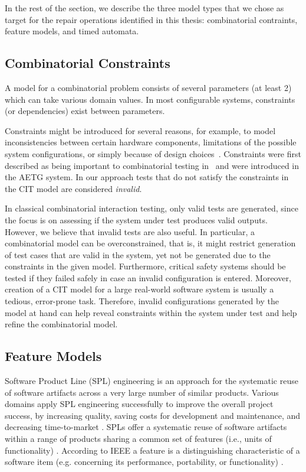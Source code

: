 \documentclass [a4paper, 12pt, twoside]{report}
\theoremstyle{plain}
\theoremstyle{definition}
\theoremstyle{remark}
\theoremstyle{plain}
\theoremstyle{plain}
\theoremstyle{remark}
\begin{document}
In the rest of the section, we describe the three model types that we chose as target for the repair operations identified in this thesis: combinatorial contraints, feature models, and timed automata.

\subsection{Combinatorial Constraints}
A model for a combinatorial problem consists of several parameters (at least 2) which can take various domain values. 
In most configurable systems, constraints (or dependencies) exist between parameters. 

Constraints might be introduced for several
reasons, for example, to model inconsistencies between certain hardware
components, limitations of the possible system configurations, or
simply because of design choices~\cite{CohenISSTA07}. Constraints were first
described as being important to combinatorial testing in~\cite{AETG}
and were introduced in the AETG system. In our approach tests that
do not satisfy the constraints in the CIT model are considered \emph{invalid}.



In classical combinatorial interaction testing, only valid tests are generated, since the focus is on assessing if the system under test produces valid outputs. 
However, we believe that invalid tests are also useful.  In particular, a combinatorial model can be overconstrained, that is, it might restrict generation of test cases that are valid in the system, yet not be generated due to the constraints in the given model. Furthermore, critical safety systems should be tested if they failed safely in case an invalid configuration is entered. Moreover, creation of a CIT model for a large real-world software system is usually a tedious, error-prone task. Therefore, invalid configurations generated by the model at hand can help reveal constraints within the system under test and help refine the combinatorial model.




\subsection{Feature Models}
Software Product Line (SPL) engineering is an approach for the systematic reuse of software artifacts across a very large number of similar products. 
Various domains apply SPL engineering successfully to improve the overall project success, by increasing quality, saving costs for development and maintenance, and decreasing time-to-market \cite{bookSPL2001}. 
SPLs offer a systematic reuse of software artifacts within a range of products sharing a common set of features (i.e., units of functionality) \cite{Griss2000}.
According to IEEE a feature is a distinguishing characteristic of a software item (e.g. concerning its performance, portability, or functionality) \cite{ieeeterminology}.
\end{document}
